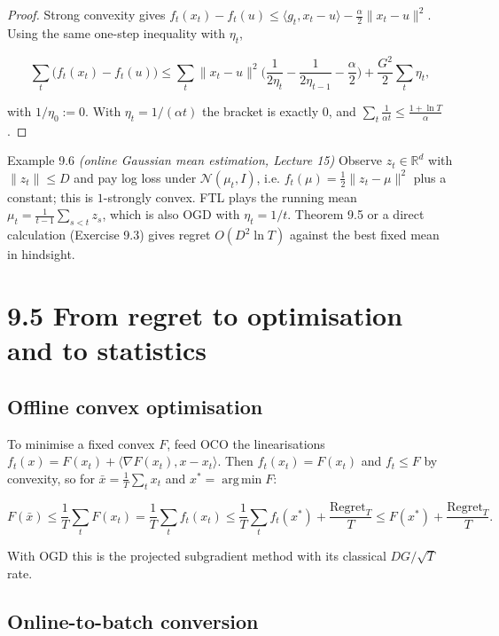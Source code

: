 \documentclass[11pt,a4paper,openany]{book}
\newcommand{\R}{\mathbb{R}}
\newcommand{\Reg}{\mathrm{Regret}}
\DeclareMathOperator*{\argmin}{arg\,min}
\newcommand{\ip}[2]{\langle #1,#2\rangle}
\newcommand{\norm}[1]{\lVert #1\rVert}
\begin{document}
\begin{proof}
Strong convexity gives $f_t(x_t)-f_t(u)\le\ip{g_t}{x_t-u}-\frac\alpha2\norm{x_t-u}^2$. Using the same one-step inequality with $\eta_t$,

\[\sum_t\big(f_t(x_t)-f_t(u)\big)\le\sum_t\norm{x_t-u}^2\Big(\frac1{2\eta_t}-\frac1{2\eta_{t-1}}-\frac\alpha2\Big)+\frac{G^2}2\sum_t\eta_t,\]

with $1/\eta_0:=0$. With $\eta_t=1/(\alpha t)$ the bracket is exactly $0$, and $\sum_t\frac1{\alpha t}\le\frac{1+\ln T}{\alpha}$.
\end{proof}

\begin{bexample}{Example 9.6 \emph{(online Gaussian mean estimation, Lecture 15)}}
Observe $z_t\in\R^d$ with $\norm{z_t}\le D$ and pay log loss under $\mathcal N(\mu_t,I)$, i.e. $f_t(\mu)=\frac12\norm{z_t-\mu}^2$ plus a constant; this is $1$-strongly convex. FTL plays the running mean $\mu_t=\frac1{t-1}\sum_{s<t}z_s$, which is also OGD with $\eta_t=1/t$. Theorem 9.5 or a direct calculation (Exercise 9.3) gives regret $O(D^2\ln T)$ against the best fixed mean in hindsight.
\end{bexample}

\section*{9.5 From regret to optimisation and to statistics}\label{ch9-batch}

\subsection*{Offline convex optimisation}

To minimise a fixed convex $F$, feed OCO the linearisations $f_t(x)=F(x_t)+\ip{\nabla F(x_t)}{x-x_t}$. Then $f_t(x_t)=F(x_t)$ and $f_t\le F$ by convexity, so for $\bar x=\frac1T\sum_tx_t$ and $x^*=\argmin F$:

\[F(\bar x)\le\frac1T\sum_tF(x_t)=\frac1T\sum_tf_t(x_t)\le\frac1T\sum_tf_t(x^*)+\frac{\Reg_T}{T}\le F(x^*)+\frac{\Reg_T}T.\]

With OGD this is the projected subgradient method with its classical $DG/\sqrt T$ rate.

\subsection*{Online-to-batch conversion}
\end{document}

